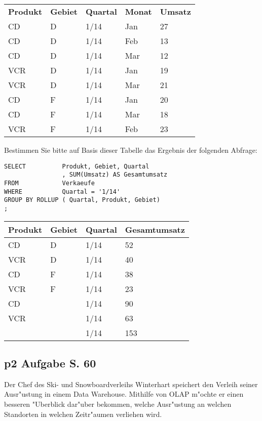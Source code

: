 \begin{tabular}{l l l l l}
    \rowcolor{LightSlateGray}
    \textbf{Produkt}    & \textbf{Gebiet}   & \textbf{Quartal}  & \textbf{Monat}    & \textbf{Umsatz}\\
    CD  & D & 1/14  & Jan   & 27\\
    CD  & D & 1/14  & Feb   & 13\\
    CD  & D & 1/14  & Mar   & 12\\
    VCR & D & 1/14  & Jan   & 19\\
    VCR & D & 1/14  & Mar   & 21\\
    CD  & F & 1/14  & Jan   & 20\\
    CD  & F & 1/14  & Mar   & 18\\
    VCR & F & 1/14  & Feb   & 23\\
\end{tabular}

\bigskip

\noindent
Bestimmen Sie bitte auf Basis dieser Tabelle das Ergebnis der folgenden Abfrage:\\

\lstset{style=customSQL}
\begin{lstlisting}
SELECT          Produkt, Gebiet, Quartal
                , SUM(Umsatz) AS Gesamtumsatz
FROM            Verkaeufe
WHERE           Quartal = '1/14'
GROUP BY ROLLUP ( Quartal, Produkt, Gebiet)
;
\end{lstlisting}

\bigskip

\begin{tabular}{ l l l l }
    \textbf{Produkt} & \textbf{Gebiet} & \textbf{Quartal} & \textbf{Gesamtumsatz}\\\hline
    \rowcolor{NavyBlue!10}  CD  & D & 1/14  & 52\\
    \rowcolor{NavyBlue!10}  VCR & D & 1/14  & 40\\
    \rowcolor{NavyBlue!10}  CD  & F & 1/14  & 38\\
    \rowcolor{NavyBlue!10}  VCR & F & 1/14  & 23\\\hline
    \rowcolor{NavyBlue!20}  CD  &   & 1/14  & 90\\
    \rowcolor{NavyBlue!20}  VCR &   & 1/14  & 63\\\hline
    \rowcolor{NavyBlue!30}      &   & 1/14  & 153\\
\end{tabular}

\subsection{p2 Aufgabe S. 60}
Der Chef des Ski- und Snowboardverleihs Winterhart speichert den Verleih seiner Ausr"ustung in einem Data Warehouse.
Mithilfe von OLAP m"ochte er einen besseren "Uberblick dar"uber bekommen, welche Ausr"ustung an welchen Standorten in welchen Zeitr"aumen verliehen wird.\\

